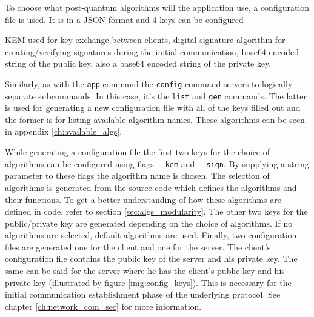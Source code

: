 To choose what post-quantum algorithms will the application use, a configuration file is used. It is in a JSON format and 4 keys can be configured
\begin{itemize}
  KEM used for key exchange between clients,
  digital signature algorithm for creating/verifying signatures during the initial communication,
  base64 encoded string of the public key,
  also a base64 encoded string of the private key.
\end{itemize}
Similarly, as with the \texttt{app} command the \texttt{config} command servers to logically separate subcommands. In this case, it's the \texttt{list} and \texttt{gen} commands. The latter is used for generating a new configuration file with all of the keys filled out and the former is for listing available algorithm names. These algorithms can be seen in appendix \ref{ch:available_algs}.

While generating a configuration file the first two keys for the choice of algorithms can be configured using flags \texttt{-\--kem} and \texttt{-\--sign}. By supplying a string parameter to these flags the algorithm name is chosen. The selection of algorithms is generated from the source code which defines the algorithms and their functions. To get a better understanding of how these algorithms are defined in code, refer to section \ref{sec:algs_modularity}. The other two keys for the public/private key are generated depending on the choice of algorithms. If no algorithms are selected, default algorithms are used. Finally, two configuration files are generated one for the client and one for the server. The client's configuration file contains the public key of the server and his private key. The same can be said for the server where he has the client's public key and his private key (illustrated by figure \ref{img:config_keys}). This is necessary for the initial communication establishment phase of the underlying protocol. See chapter \ref{ch:network_com_sec} for more information.
